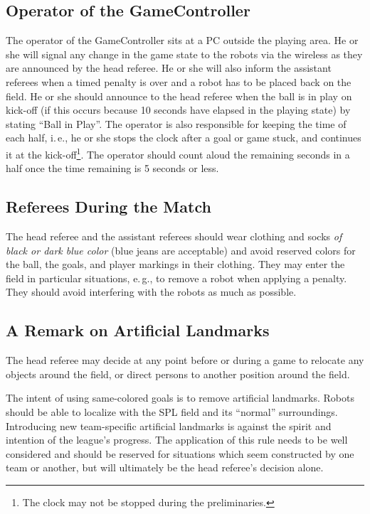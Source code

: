 \documentclass[12pt]{article}
\newcommand{\ie}{\mbox{i.\,e.}\xspace}
\newcommand{\eg}{\mbox{e.\,g.}\xspace}
\begin{document}
\subsection{Operator of the GameController}
\label{sec:gameControllerOp}
The operator of the GameController sits at a PC outside the playing area. He or she will signal any change in the game state to the robots via the wireless as they are announced by the head referee. He or she will also inform the assistant referees when a timed penalty is over and a robot has to be placed back on the field. He or she should announce to the head referee when the ball is in play on kick-off (if this occurs because 10 seconds have elapsed in the playing state) by stating ``Ball in Play''. The operator is also responsible for keeping the time of each half, \ie, he or she stops the clock after a goal or game stuck, and continues it at the kick-off\footnote{The clock may not be stopped during the preliminaries.}.  The operator should count aloud the remaining seconds in a half once the time remaining is 5 seconds or less.

\subsection{Referees During the Match}

The head referee and the assistant referees should wear clothing and socks \emph{of black or dark blue color} (blue jeans are acceptable) and avoid reserved colors for the ball, the goals, and player markings in their clothing. They may enter the field in particular situations, \eg, to remove a robot when applying a penalty. They should avoid interfering with the robots as much as possible.

\subsection{A Remark on Artificial Landmarks}
\label{sec:judgement:landmarks}

The head referee may decide at any point before or during a game to relocate any objects around the field, or direct persons to another position around the field.

The intent of using same-colored goals is to remove artificial landmarks.
Robots should be able to localize with the SPL field and its ``normal'' surroundings.
Introducing new team-specific artificial landmarks is against the spirit and intention of the league's progress.
The application of this rule needs to be well considered and should be reserved for situations which seem constructed by one team or another, but will ultimately be the head referee's decision alone.
\end{document}
